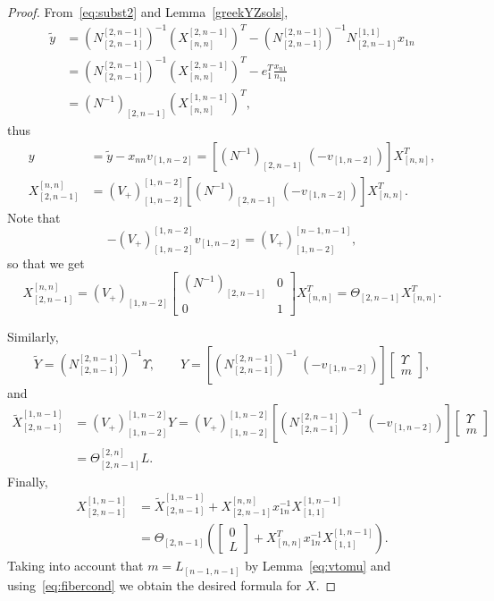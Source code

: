 \documentclass{amsart}
\theoremstyle{definition}
\theoremstyle{remark}
\numberwithin{equation}{section}
\numberwithin{theorem}{section}
\def\wY{{\widetilde{Y}}}
\begin{document}
\begin{proof}
From~\eqref{eq:subst2} and Lemma~\ref{greekYZsols},
\begin{align*}
\tilde y&= \left ( N_{[2,n-1]}^{[2,n-1]}\right ) ^{-1} (X_{[n,n]}^{[2,n-1]})^T -  
\left ( N_{[2,n-1]}^{[2,n-1]}\right ) ^{-1} N^{[1,1]}_{[2,n-1]} x_{1n} \\
&= \left ( N_{[2,n-1]}^{[2,n-1]}\right ) ^{-1} (X_{[n,n]}^{[2,n-1]})^T - 
e_1^T\frac{x_{n1}}{n_{11}} \\
&= \left ( N^{-1}\right )_{[2,n-1]}(X_{[n,n]}^{[1,n-1]})^T ,
\end{align*}
thus
\begin{align*}
y &= \tilde y - x_{nn} v_{[1,n-2]} = \left [ \left ( N^{-1}\right )_{[2,n-1]} \ (- v_{[1,n-2]})\right ] X_{[n,n]}^T,\\
X^{[n,n]}_{[2,n-1]}&=(V_+)_{[1,n-2]}^{[1,n-2]}\left[\left( N^{-1}\right )_{[2,n-1]}\  (- v_{[1,n-2]})\right]X_{[n,n]}^T.
\end{align*}
Note that
\[
-(V_+)_{[1,n-2]}^{[1,n-2]} v_{[1,n-2]} = (V_+)_{[1,n-2]}^{[n-1,n-1]}, 
\]
so that  we get
\[
X^{[n,n]}_{[2,n-1]}= (V_+)_{[1,n-2]} \begin{bmatrix}  \left ( N^{-1}\right )_{[2,n-1]}  & 0\\ 0 & 1  \end{bmatrix} 
X_{[n,n]}^T= \Theta_{[2,n-1]} X_{[n,n]}^T.
\]

Similarly,
\[
\wY= \left ( N_{[2,n-1]}^{[2,n-1]}\right ) ^{-1} \Upsilon,\qquad  
Y =  \left [  \left ( N_{[2,n-1]}^{[2,n-1]}\right )^{-1}  \  (- v_{[1,n-2]}) \right ] 
\begin{bmatrix}\Upsilon \\ m\end{bmatrix},
\]
and
\begin{align*}
\tilde X_{[2,n-1]}^{[1,n-1]}& = (V_+)_{[1,n-2]}^{[1,n-2]} Y = (V_+)_{[1,n-2]}^{[1,n-2]}  \left [   \left ( N_{[2,n-1]}^{[2,n-1]}\right )^{-1} \  (- v_{[1,n-2]}) \right ] 
\begin{bmatrix}\Upsilon \\ m\end{bmatrix}\\& =\Theta_{[2,n-1]}^{[2,n]}  L.
\end{align*}
Finally,
\begin{align*}
X_{[2,n-1]}^{[1,n-1]}& = \tilde X_{[2,n-1]}^{[1,n-1]} +  X^{[n,n]}_{[2,n-1]} x_{1n}^{-1}X_{[1,1]}^{[1,n-1]} \\
&=\Theta_{[2,n-1]} \left ( \begin{bmatrix}0\\ L\end{bmatrix} + X_{[n,n]}^T x_{1n}^{-1}X_{[1,1]}^{[1,n-1]}   \right ).
\end{align*}
Taking into account that $m=L_{[n-1,n-1]}$ by Lemma~\ref{eq:vtomu} and using~\eqref{eq:fibercond} we obtain the desired formula for $X$.
\end{proof}
\end{document}
